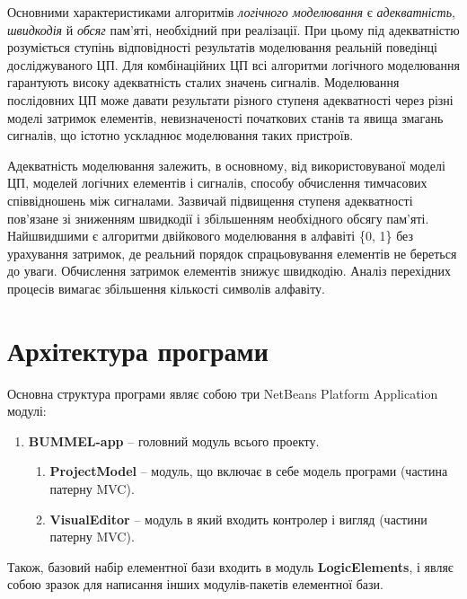 \documentclass[12pt,a4paper]{article}
\begin{document}
Основними характеристиками алгоритмів \emph{логічного моделювання} є \emph{адекватність}, \emph{швидкодія} й \emph{обсяг} пам'яті, необхідний при реалізації. При цьому під адекватністю розуміється ступінь відповідності результатів моделювання реальній поведінці досліджуваного ЦП. Для комбінаційних ЦП всі алгоритми логічного моделювання гарантують високу адекватність сталих значень сигналів. Моделювання послідовних ЦП може давати результати різного ступеня адекватності через різні моделі затримок елементів, невизначеності початкових станів та явища змагань сигналів, що істотно ускладнює моделювання таких пристроїв.

Адекватність моделювання залежить, в основному, від використовуваної моделі ЦП, моделей логічних елементів і сигналів, способу обчислення тимчасових співвідношень між сигналами. Зазвичай підвищення ступеня адекватності пов'язане зі зниженням швидкодії і збільшенням необхідного обсягу пам'яті. Найшвидшими є алгоритми двійкового моделювання в алфавіті \{0, 1\} без урахування затримок, де реальний порядок спрацьовування елементів не береться до уваги. Обчислення затримок елементів знижує швидкодію. Аналіз перехідних процесів вимагає збільшення кількості символів алфавіту.

\clearpage

\section{Архітектура програми}

Основна структура програми являє собою три NetBeans Platform Application модулі:
\begin{enumerate}
  \item \textbf{BUMMEL-app} -- головний модуль всього проекту.
  \begin{enumerate}
    \item \textbf{ProjectModel} -- модуль, що включає в себе модель програми (частина патерну MVC).
    \item \textbf{VisualEditor} -- модуль в який входить контролер і вигляд (частини патерну MVC).
  \end{enumerate}
\end{enumerate}
Також, базовий набір елементної бази входить в модуль \textbf{LogicElements}, і являє собою зразок для написання інших модулів-пакетів елементної бази.
\end{document}

